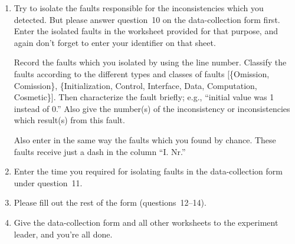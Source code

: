 \begin{enumerate}
\addtocounter{enumi}{10}

\item Try to isolate the faults responsible for the inconsistencies
which you detected.
But please answer question~10 on the data-collection form first.
Enter the isolated faults in the worksheet provided for that purpose,
and again don't forget to enter your identifier on that sheet.

Record the faults which you isolated by using the line number.
Classify the faults according to the different types and classes of
faults [\{Omission, Comission\}, \{Initialization, Control,
Interface, Data, Computation, Cosmetic\}]. 
Then characterize the fault briefly; e.g., ``initial value was 1 instead
of 0.''
Also give the number(s) of the inconsistency or inconsistencies which
result(s) from this fault.

Also enter in the same way the faults which you found by chance.
These faults receive just a dash in the column ``I. Nr.''

\item Enter the time you required for isolating faults in the
data-collection form under question~11.

\item Please fill out the rest of the form (questions~12--14).

\item Give the data-collection form and all other worksheets to the
experiment leader, and you're all done.

\end{enumerate}
